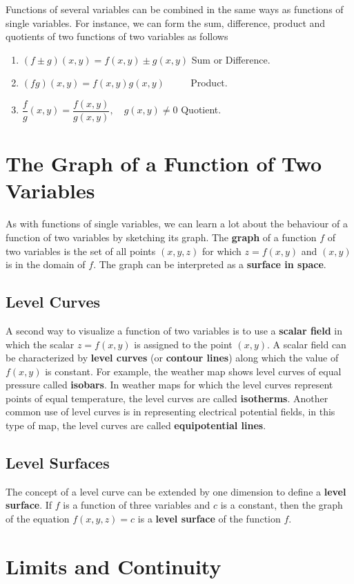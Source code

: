 \documentclass[titlepage,a4paper,12pt]{report}
\begin{document}
\noindent Functions of several variables can be combined in the same ways as functions of single variables. For instance, we can form the sum, difference, product and quotients of two functions of two variables as follows 
\begin{enumerate}
\item $(f\pm g)(x,y)=f(x,y)\pm g(x,y)$ \quad Sum or Difference.
\item $(fg)(x,y)=f(x,y)g(x,y)$ \quad \quad ~~~~  Product.
\item $\dfrac{f}{g}(x,y)=\dfrac{f(x,y)}{g(x,y)}, \quad g(x,y)\neq 0$ \quad Quotient.
\end{enumerate}
\section{The Graph of a Function of Two Variables}
As with functions of single variables, we can learn a lot about the behaviour of a function of two variables by sketching its graph. The \textbf{graph} of a function $f$ of two variables is the set of all points $(x,y,z)$ for which $z=f(x,y)$ and $(x,y)$ is in the domain of $f$. The graph can be interpreted as a \textbf{surface in space}.
\subsection{Level Curves}
A second way to visualize a function of two variables is to use a \textbf{scalar field} in which the scalar $z=f(x,y)$ is assigned to the point $(x,y)$. A scalar field can be characterized by \textbf{level curves} (or \textbf{contour lines}) along which the value of $f(x,y)$ is constant. For example, the weather map shows level curves of equal pressure called \textbf{isobars}. In weather maps for which the level curves represent points of equal temperature, the level curves are called \textbf{isotherms}. Another common use of level curves is in representing electrical potential fields, in this type of map, the level curves are called \textbf{equipotential lines}.
\subsection{Level Surfaces}
The concept of a level curve can be extended by one dimension to define a \textbf{level surface}. If $f$ is a function of three variables and $c$ is a constant, then the graph of the equation $f(x,y,z)=c$ is a \textbf{level surface} of the function $f$.
\section{Limits and Continuity}
\end{document}
